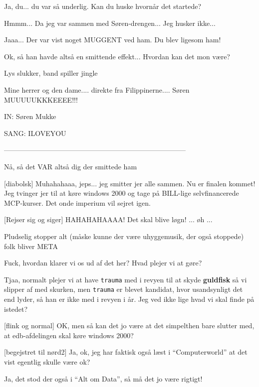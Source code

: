 \documentclass[danish]{article}
\begin{document}
\begin{sketch}
 Ja, du... du var så underlig. Kan du huske hvornår det startede?

 Hmmm... Da jeg var sammen med Søren-drengen... Jeg husker ikke...

 Jaaa... Der var vist noget MUGGENT ved ham. Du blev ligesom ham!

 Ok, så han havde altså en smittende effekt... Hvordan kan det mon være?

\scene Lys slukker, band spiller jingle

 Mine herrer og den dame.... direkte fra Filippinerne....  Søren
MUUUUUKKKEEEE!!!

\scene IN: Søren Mukke

\scene SANG: ILOVEYOU

\scene ------------------------------------------------------------------------------

 Nå, så det VAR altså dig der smittede ham 

[diabolsk] Muhahahaaa, jeps... jeg smitter jer alle sammen.  Nu er
finalen kommet! Jeg tvinger jer til at køre windows 2000 og tage på BILL-lige
selvfinancerede MCP-kurser. Det onde imperium vil sejret igen.

[Rejser sig og siger] HAHAHAHAAAA! Det skal blive løgn! ... øh ...

\scene Pludselig stopper alt (måske kunne der være uhyggemusik, der også
stoppede) folk bliver META

 Fuck, hvordan klarer vi os ud af det her? Hvad plejer vi at gøre?

 Tjaa, normalt plejer vi at have \texttt{trauma} med i revyen til at
skyde \textbf{guldfisk}  så vi slipper af med skurken, men
\texttt{trauma} er blevet kandidat, hvor usandsynligt det end lyder, så han er
ikke med i revyen i år. Jeg ved ikke lige hvad vi skal finde på istedet?

[flink og normal] OK, men så kan det jo være at det simpelthen bare
slutter med, at edb-afdelingen skal køre windows 2000?

[begejstret til nørd2] Ja, ok, jeg har faktisk også læst i
``Computerworld'' at det vist egentlig skulle være ok?

 Ja, det stod der også i ``Alt om Data'', så må det jo være rigtigt!


\end{sketch}
\end{document}

